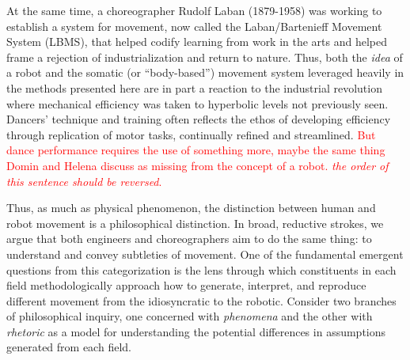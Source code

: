 \documentclass[arts,article,submit,moreauthors,pdftex,10pt,a4paper]{mdpi}
\begin{document}
At the same time, a choreographer Rudolf Laban (1879-1958) \cite{bradley2008rudolf} was working to establish a system for movement, now called the Laban/Bartenieff Movement System (LBMS), that helped codify learning from work in the arts and helped frame a rejection of industrialization and return to nature.  Thus, both the \textit{idea} of a robot and the somatic (or ``body-based'') movement system leveraged heavily in the methods presented here are in part a reaction to the industrial revolution where mechanical efficiency was taken to hyperbolic levels not previously seen.  
Dancers’ technique and training often reflects the ethos of developing efficiency through replication of motor tasks, continually refined and streamlined. \textcolor{red}{But dance performance requires the use of something more, maybe the same thing Domin and Helena discuss as missing from the concept of a robot. \textit{the order of this sentence should be reversed}.} 

Thus, as much as physical phenomenon, the distinction between human and robot movement is a philosophical distinction.
In broad, reductive strokes, we argue that both engineers and choreographers aim to do the same thing:  to understand and convey subtleties of movement. One of the fundamental emergent questions from this categorization is the lens through which constituents in each field methodologically approach how to generate, interpret, and reproduce different movement from the idiosyncratic to the robotic.  %
Consider two branches of philosophical inquiry, one concerned with \textit{phenomena} and the other with \textit{rhetoric} as a model for understanding the potential differences in assumptions generated from each field. 
\end{document}

